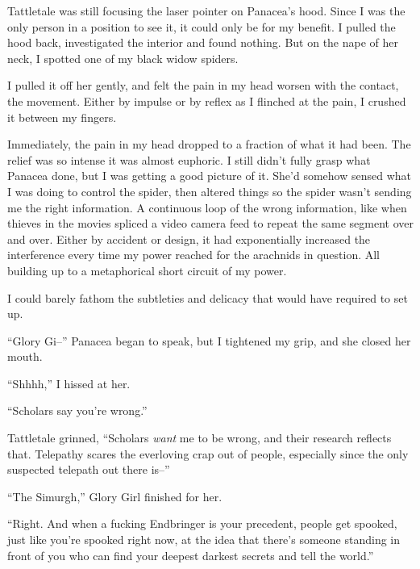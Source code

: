 Tattletale was still focusing the laser pointer on Panacea's hood.  Since I was the only person in a position to see it, it could only be for my benefit.  I pulled the hood back, investigated the interior and found nothing.  But on the nape of her neck, I spotted one of my black widow spiders.



I pulled it off her gently, and felt the pain in my head worsen with the contact, the movement.  Either by impulse or by reflex as I flinched at the pain, I crushed it between my fingers.



Immediately, the pain in my head dropped to a fraction of what it had been.  The relief was so intense it was almost euphoric.  I still didn't fully grasp what Panacea done, but I was getting a good picture of it.  She'd somehow sensed what I was doing to control the spider, then altered things so the spider wasn't sending me the right information.  A continuous loop of the wrong information, like when thieves in the movies spliced a video camera feed to repeat the same segment over and over.  Either by accident or design, it had exponentially increased the interference every time my power reached for the arachnids in question.  All building up to a metaphorical short circuit of my power.



I could barely fathom the subtleties and delicacy that would have required to set up.



``Glory Gi--'' Panacea began to speak, but I tightened my grip, and she closed her mouth.



``Shhhh,'' I hissed at her.



``Scholars say you're wrong.''



Tattletale grinned, ``Scholars \emph{want} me to be wrong, and their research reflects that.  Telepathy scares the everloving crap out of people, especially since the only suspected telepath out there is--''



``The Simurgh,'' Glory Girl finished for her.



``Right.  And when a fucking Endbringer is your precedent, people get spooked, just like you're spooked right now, at the idea that there's someone standing in front of you who can find your deepest darkest secrets and tell the world.''



